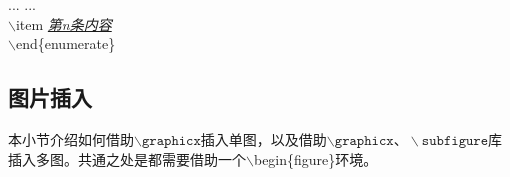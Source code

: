 \documentclass[11pt]{article}
\begin{document}
\begin{enumerate}
\begin{multicols}{2}
{\begin{minipage}{7cm}
    				\hspace*{2em}... ... \\
    				\hspace*{2em}$\backslash$item \textit{\underline{第n条内容}} \\
    				$\backslash$end\{enumerate\}
    		\end{minipage}}
    	\end{multicols}
    \end{enumerate}
    \subsection{图片插入}
    本小节介绍如何借助$\mathtt{\backslash graphicx}$插入单图，以及借助$\mathtt{\backslash graphicx 、\backslash subfigure}$库插入多图。共通之处是都需要借助一个$\backslash$begin\{figure\}环境。
\end{document}
